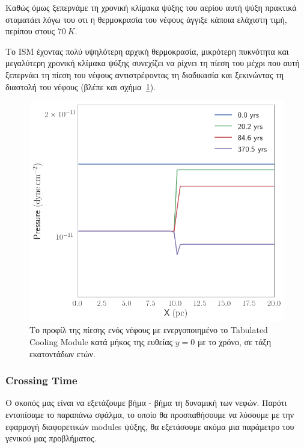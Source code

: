 \documentclass[article,a4paper,11.2pt]{memoir}
\numberwithin{equation}{subsection}
\begin{document}
		Καθώς όμως ξεπερνάμε τη χρονική κλίμακα ψύξης του αερίου αυτή ψύξη πρακτικά  σταματάει λόγω του οτι η θερμοκρασία του νέφους άγγιξε κάποια ελάχιστη τιμή, περίπου στους $\SI{70}{K}$. 

 	Το ISM έχοντας πολύ υψηλότερη αρχική θερμοκρασία, μικρότερη πυκνότητα και μεγαλύτερη χρονική κλίμακα ψύξης συνεχίζει να ρίχνει τη πίεση του μέχρι που αυτή ξεπερνάει τη πίεση του νέφους αντιστρέφοντας τη διαδικασία και ξεκινώντας τη διαστολή του νέφους (βλέπε και σχήμα~\ref{fig:tabcoolingprsprofile-micro}).
	
\begin{figure}[h]
		\begin{adjustwidth}{-0cm}{-5cm}
	\includegraphics[width=1\linewidth]{DataImages/TabCoolingPRSprofile-micro}
	\caption{Το προφίλ της πίεσης ενός νέφους με ενεργοποιημένο το Tabulated Cooling Module κατά μήκος της ευθείας $y=0$ με το χρόνο, σε τάξη εκατοντάδων ετών.}
	\label{fig:tabcoolingprsprofile-micro}
\end{adjustwidth}
\end{figure}



	

	\subsubsection{Crossing Time}
	Ο σκοπός μας είναι να εξετάζουμε βήμα - βήμα τη δυναμική των νεφών. Παρότι εντοπίσαμε το παραπάνω σφάλμα, το οποίο θα προσπαθήσουμε να λύσουμε με την εφαρμογή διαφορετικών modules ψύξης, θα εξετάσουμε ακόμα μια παράμετρο του γενικού μας προβλήματος.
	
\end{document}
